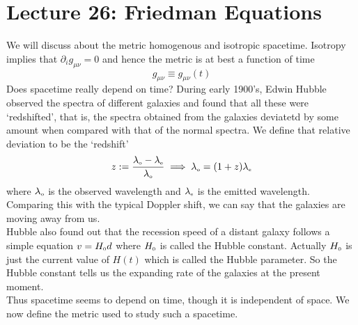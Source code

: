 \section*{Lecture 26: Friedman Equations}
We will discuss about the metric homogenous and isotropic spacetime. Isotropy implies that $\partial_i g_{\mu\nu} = 0$ and hence the metric is at best a function of time
$$g_{\mu\nu} \equiv g_{\mu\nu}(t)$$
Does spacetime really depend on time? During early 1900's, Edwin Hubble observed the spectra of different galaxies and found that all these were `redshifted', that is, the spectra obtained from the galaxies deviatetd by some amount when compared with that of the normal spectra. We define that relative deviation to be the `redshift' 
$$z := \frac{\lambda_{\text{\tiny o}}-\lambda_{\text{\tiny e}}}{\lambda_{\text{\tiny o}}} \implies \lambda_{\text{\tiny o}} = (1+z)\lambda_{\text{\tiny e}}$$
where $\lambda_{\text{\tiny o}}$ is the observed wavelength and $\lambda_{\text{\tiny e}}$ is the emitted wavelength. Comparing this with the typical Doppler shift, we can say that the galaxies are moving away from us. \\[0.2cm]
Hubble also found out that the recession speed of a distant galaxy follows a simple equation $v = H_{\text{\tiny 0}}d$ where $H_{\text{\tiny 0}}$ is called the Hubble constant. Actually $H_{\text{\tiny 0}}$ is just the current value of $H(t)$ which is called the Hubble parameter. So the Hubble constant tells us the expanding rate of the galaxies at the present moment. \\[0.2cm]
Thus spacetime seems to depend on time, though it is independent of space. We now define the metric used to study such a spacetime. 
